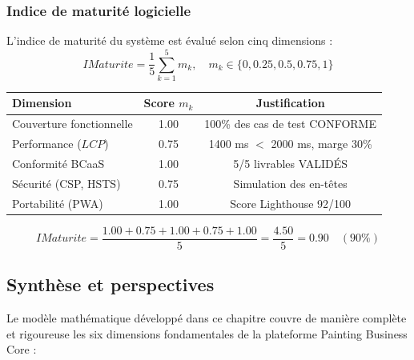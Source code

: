\documentclass[12pt,a4paper]{report}
\begin{document}
\subsubsection*{Indice de maturité logicielle}

L'indice de maturité du système est évalué selon cinq dimensions :
\[
IMaturite = \frac{1}{5}\sum_{k=1}^{5} m_k, \quad m_k \in \{0, 0.25, 0.5, 0.75, 1\}
\]

\begin{center}
\renewcommand{\arraystretch}{1.3}
\begin{tabular}{lcc}
\toprule
\textbf{Dimension} & \textbf{Score $m_k$} & \textbf{Justification} \\
\midrule
Couverture fonctionnelle  & 1.00 & 100\% des cas de test CONFORME \\
Performance ($LCP$)       & 0.75 & 1400 ms $<$ 2000 ms, marge 30\% \\
Conformité BCaaS          & 1.00 & 5/5 livrables VALIDÉS \\
Sécurité (CSP, HSTS)      & 0.75 & Simulation des en-têtes \\
Portabilité (PWA)         & 1.00 & Score Lighthouse 92/100 \\
\bottomrule
\end{tabular}
\end{center}

\[
IMaturite = \frac{1.00 + 0.75 + 1.00 + 0.75 + 1.00}{5} = \frac{4.50}{5} = 0.90 \quad (90\%)
\]

\subsection{Synthèse et perspectives}

Le modèle mathématique développé dans ce chapitre couvre de manière complète et
rigoureuse les six dimensions fondamentales de la plateforme Painting Business Core :
\end{document}
